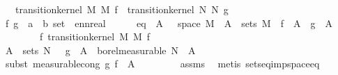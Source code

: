 \begin{isabellebody}
\ \ \ {\isachardoublequoteopen}transition{\isacharunderscore}{\kern0pt}kernel\ M\ M{\isacharprime}{\kern0pt}\ f\ {\isacharequal}{\kern0pt}\ transition{\isacharunderscore}{\kern0pt}kernel\ N\ N{\isacharprime}{\kern0pt}\ g{\isachardoublequoteclose}\isanewline
%
\isadelimproof
%
\endisadelimproof
%
\isatagproof
{}\isamarkupfalse%
\ {\isacharminus}{\kern0pt}\isanewline
\ \ \isacommand{{\isacharbraceleft}{\kern0pt}}\isamarkupfalse%
\isanewline
\ \ \ \ \isamarkupfalse%
\ f\ g\ {\isacharcolon}{\kern0pt}{\isacharcolon}{\kern0pt}\ {\isachardoublequoteopen}{\isacharprime}{\kern0pt}a\ {\isasymRightarrow}\ {\isacharprime}{\kern0pt}b\ set\ {\isasymRightarrow}\ ennreal{\isachardoublequoteclose}\isanewline
\ \ \ \ \isamarkupfalse%
\ eq{\isacharcolon}{\kern0pt}\ {\isachardoublequoteopen}{\isasymAnd}{\isasymomega}\ A{\isacharprime}{\kern0pt}{\isachardot}{\kern0pt}\ {\isasymomega}\ {\isasymin}\ space\ M\ {\isasymLongrightarrow}\ A{\isacharprime}{\kern0pt}\ {\isasymin}\ sets\ M{\isacharprime}{\kern0pt}\ {\isasymLongrightarrow}\ f\ {\isasymomega}\ A{\isacharprime}{\kern0pt}\ {\isacharequal}{\kern0pt}\ g\ {\isasymomega}\ A{\isacharprime}{\kern0pt}{\isachardoublequoteclose}\isanewline
\ \ \ \ \ \ \ \ f{\isacharcolon}{\kern0pt}\ {\isachardoublequoteopen}transition{\isacharunderscore}{\kern0pt}kernel\ M\ M{\isacharprime}{\kern0pt}\ f{\isachardoublequoteclose}\isanewline
\ \ \ \ \isamarkupfalse%
\ \isamarkupfalse%
\ {\isachardoublequoteopen}A{\isacharprime}{\kern0pt}\ {\isasymin}\ sets\ N{\isacharprime}{\kern0pt}\ {\isasymLongrightarrow}\ {\isacharparenleft}{\kern0pt}{\isasymlambda}{\isasymomega}{\isachardot}{\kern0pt}\ g\ {\isasymomega}\ A{\isacharprime}{\kern0pt}{\isacharparenright}{\kern0pt}\ {\isasymin}\ borel{\isacharunderscore}{\kern0pt}measurable\ N{\isachardoublequoteclose}\ \ A{\isacharprime}{\kern0pt}\isanewline
\ \ \ \ \ \ \isamarkupfalse%
\ {\isacharparenleft}{\kern0pt}subst\ measurable{\isacharunderscore}{\kern0pt}cong{\isacharbrackleft}{\kern0pt}\ g{\isacharequal}{\kern0pt}{\isachardoublequoteopen}{\isasymlambda}{\isasymomega}{\isachardot}{\kern0pt}\ f\ {\isasymomega}\ A{\isacharprime}{\kern0pt}{\isachardoublequoteclose}{\isacharbrackright}{\kern0pt}{\isacharparenright}{\kern0pt}\isanewline
\ \ \ \ \ \ \ \isamarkupfalse%
\ assms\ \isamarkupfalse%
\ {\isacharparenleft}{\kern0pt}metis\ sets{\isacharunderscore}{\kern0pt}eq{\isacharunderscore}{\kern0pt}imp{\isacharunderscore}{\kern0pt}space{\isacharunderscore}{\kern0pt}eq{\isacharparenright}{\kern0pt}\isanewline

\end{isabellebody}
